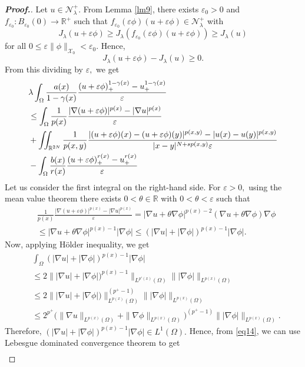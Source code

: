 \documentclass[11pt]{article}
\newcommand{\R}{\mathbb{R}}
\newcommand{\X}{\mathcal{X}_{0}}
\newcommand{\Nh}{\mathcal{N}_\la}
\newcommand{\ve}{\varepsilon}
\newcommand{\ga} {\gamma}
\newcommand{\om} {\Omega}
\newcommand{\la} {\lambda}
\newcommand{\ra} {\rightarrow}
\newcommand{\real}{\mathbb{R}}
\newcommand{\lv}{\lVert}
\newcommand{\rv}{\rVert}
\newcommand{\grad}{\nabla}
\begin{document}
\begin{proof}[\bf Proof.]
    Let $u\in \Nh^+.$
From Lemma \ref{lm9}, there exists 
$\ve_0>0$
and 
$f_{\ve_0}:B_{\varepsilon_{0}}(0)\ra \R^+$
such that 
$f_{\ve_0}(\ve \phi)(u+\ve\phi)\in\Nh^+$
with 
$$
J_\la(u+\ve\phi)\ge J_\la(f_{\ve_0}(\ve \phi)
(u+\ve\phi))\geq J_\la(u)
$$
for all $0\leq \ve \lv \phi \rv_{\X}<\ve_0.$
Hence,
    $$J_\la(u+\ve\phi)-J_\la(u)\ge0.$$
    From this dividing by $\ve,$
we get
    \begin{align}\label{eq15}
&    \la
\int_\om 
\frac{a(x)}{1-\ga(x)} 
\frac{(u+\ve\phi)_+^{1-\ga(x)}-u_+^{1-\ga(x)}}{\ve} 
\notag \\
&\le    
\int_\om 
\frac{1}{p(x)}
\frac{|\grad (u+\ve\phi)|^{p(x)}-
|\grad u|^{p(x)}}{\ve}\nonumber\\
        &+\iint_{\mathbb{R}^{2N}} 
\frac{1}{p(x,y)}
\frac{|(u+\ve\phi)(x)-(u+\ve\phi)(y)|^{p(x,y)}
-|u(x)-u(y)|^{p(x,y)}}{|x-y|^{N+sp(x,y)}\ve}
\nonumber\\
        &-
\int_\om 
\frac{b(x)}{r(x)}
\frac{(u+\ve\phi)_+^{r(x)}-u_+^{r(x)}}{\ve}
    \end{align}
    Let us consider the first integral 
    on the right-hand side.
For $\ve>0,$
using the mean value theorem there exists 
$0<\theta\in \real$
with $0<\theta<\ve$
such that
 \begin{align}\label{eq14}
 &
\frac{1}{p(x)}
\frac{|\grad (u+\ve\phi)|^{p(x)}-
|\grad u|^{p(x)}}{\ve}
 =|\grad u+
\theta\grad\phi|^{p(x)-2}(\grad u+\theta\grad\phi)
\grad\phi\nonumber\\
    & \le |\grad u+\theta\grad\phi|^{p(x)-1}|\grad\phi|
  \le(|\grad u|+|\grad\phi|)^{p(x)-1}|\grad\phi|.
    \end{align}
    Now, applying H\"older inequality, 
    we get
\begin{align*}
&
\int_\om (|\grad u|+
|\grad\phi|)^{p(x)-1}|\grad\phi| \\
&
  \le 2 \||\grad u|+
    |\grad\phi|)^{p(x)-1}\|_{L^{p'(x)}(\om)}
    \||\grad\phi|\|_{L^{p(x)}(\om)}\\
    &\le 2 \||\grad u|+
    |\grad\phi|)\|^{(p^+-1)}_{L^{p(x)}(\om)}
    \||\grad\phi|\|_{L^{p(x)}(\om)}\\
    &\le 2^{p^+} 
    \Big (\|\grad u\|_{L^{p(x)}(\om)}+
    \|\grad\phi\|_{L^{p(x)}(\om)}\Big )^{(p^+-1)}
    \||\grad\phi|\|_{L^{p(x)}(\om)}.
    \end{align*}
Therefore, 
$(|\grad u|+|\grad\phi|)^{p(x)-1}|
\grad\phi|\in L^1(\om).$
Hence, from \eqref{eq14}, 
we can use Lebesgue 
dominated convergence theorem to get
\begin{align*}

\end{align*}
\end{proof}
\end{document}

